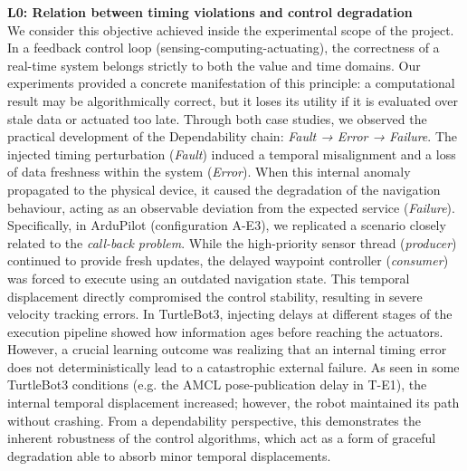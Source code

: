 \noindent\textbf{L0: Relation between timing violations and control degradation} \\ %
We consider this objective achieved inside the experimental scope of the project. In a feedback control loop (sensing-computing-actuating), the correctness of a real-time system belongs strictly to both the value and time domains. Our experiments provided a concrete manifestation of this principle: a computational result may be algorithmically correct, but it loses its utility if it is evaluated over stale data or actuated too late.
Through both case studies, we observed the practical development of the Dependability chain: \textit{Fault → Error → Failure}. The injected timing perturbation (\textit{Fault}) induced a temporal misalignment and a loss of data freshness within the system (\textit{Error}). When this internal anomaly propagated to the physical device, it caused the degradation of the navigation behaviour, acting as an observable deviation from the expected service (\textit{Failure}).
Specifically, in ArduPilot (configuration A-E3), we replicated a scenario closely related to the \textit{call-back problem}. While the high-priority sensor thread (\textit{producer}) continued to provide fresh updates, the delayed waypoint controller (\textit{consumer}) was forced to execute using an outdated navigation state. This temporal displacement directly compromised the control stability, resulting in severe velocity tracking errors.
In TurtleBot3, injecting delays at different stages of the execution pipeline showed how information ages before reaching the actuators. However, a crucial learning outcome was realizing that an internal timing error does not deterministically lead to a catastrophic external failure. As seen in some TurtleBot3 conditions (e.g. the AMCL pose-publication delay in T-E1), the internal temporal displacement increased; however, the robot maintained its path without crashing. From a dependability perspective, this demonstrates the inherent robustness of the control algorithms, which act as a form of graceful degradation able to absorb minor temporal displacements.


